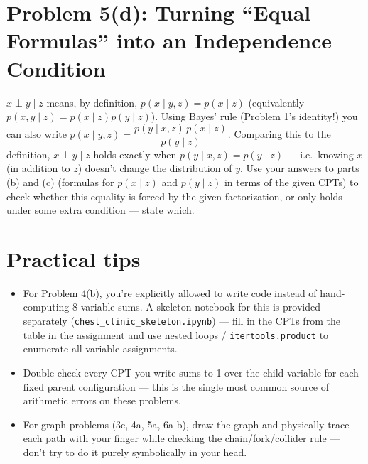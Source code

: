 \documentclass[11pt]{article}
\begin{document}
\section*{Problem 5(d): Turning ``Equal Formulas'' into an Independence Condition}

$x \perp y \mid z$ means, by definition,
$p(x\mid y,z) = p(x\mid z)$ (equivalently $p(x,y\mid z)=p(x\mid z)p(y\mid z)$).
Using Bayes' rule (Problem 1's identity!) you can also write
$p(x\mid y,z) = \dfrac{p(y\mid x,z)\,p(x\mid z)}{p(y\mid z)}$. Comparing
this to the definition, $x\perp y\mid z$ holds exactly when
$p(y\mid x,z) = p(y\mid z)$ --- i.e.\ knowing $x$ (in addition to $z$)
doesn't change the distribution of $y$. Use your answers to parts (b)
and (c) (formulas for $p(x\mid z)$ and $p(y\mid z)$ in terms of the
given CPTs) to check whether this equality is forced by the given
factorization, or only holds under some extra condition --- state
which.

\section*{Practical tips}
\begin{itemize}
  \item For Problem 4(b), you're explicitly allowed to write code
        instead of hand-computing 8-variable sums. A skeleton notebook
        for this is provided separately
        (\texttt{chest\_clinic\_skeleton.ipynb}) --- fill in the CPTs
        from the table in the assignment and use nested loops /
        \texttt{itertools.product} to enumerate all variable
        assignments.
  \item Double check every CPT you write sums to 1 over the child
        variable for each fixed parent configuration --- this is the
        single most common source of arithmetic errors on these
        problems.
  \item For graph problems (3c, 4a, 5a, 6a-b), draw the graph and
        physically trace each path with your finger while checking the
        chain/fork/collider rule --- don't try to do it purely
        symbolically in your head.
\end{itemize}
\end{document}
